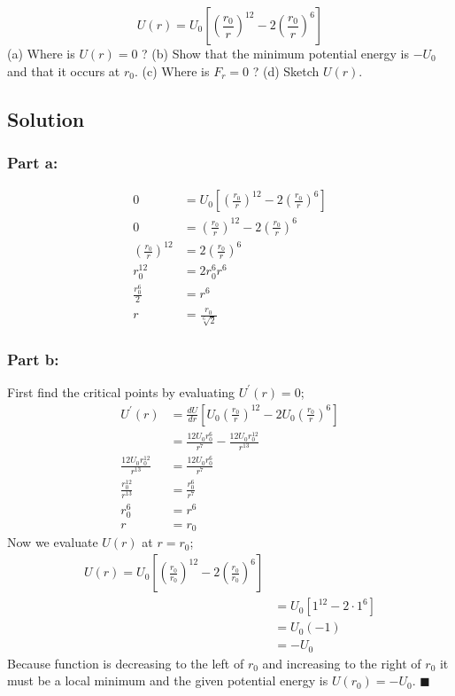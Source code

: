 \documentclass{article}
\begin{document}
\[
	U(r) = U_0 \left[ \left( \frac{r_0}{r} \right)^{12} - 2 \left( \frac{r_0}{r}\right)^6 \right]
\]
(a) Where is $U(r)=0$ ? (b) Show that the minimum potential energy is $-U_0$ and that it occurs at $r_0$. (c)
Where is $F_r = 0$ ? (d) Sketch $U(r)$.

\subsection*{Solution}
\subsubsection*{Part a:}
\begin{align*}
	0 &= U_0 \left[ \left( \frac{r_0}{r} \right)^{12} - 2 \left( \frac{r_0}{r}\right)^6 \right] \\
	0 &= \left( \frac{r_0}{r} \right)^{12} - 2 \left( \frac{r_0}{r}\right)^6 \\
	\left( \frac{r_0}{r} \right)^{12} &= 2 \left( \frac{r_0}{r}\right)^6 \\
	r_0^{12} &= 2 r_0^6 r^6 \\
	\frac{r_0^6}{2} &= r^6 \\
	r &= \frac{r_0}{\sqrt[6]{2}}
\end{align*}

\subsubsection*{Part b:}
First find the critical points by evaluating $U^\prime(r) = 0$;
\begin{align*}
	U^\prime (r) &= \frac{dU}{dr} \left[ U_0\left( \frac{r_0}{r} \right)^{12} - 2 U_0\left( \frac{r_0}{r}\right)^6 \right] \\
		     &= \frac{12U_{0} r_{0}^{6}}{r^{7}} - \frac{12U_{0} r_{0}^{12}}{r^{13}} \\
	\frac{12U_{0} r_{0}^{12}}{r^{13}} &= \frac{12U_{0} r_{0}^{6}}{r^{7}} \\
	\frac{r_0^{12}}{r^{13}} &= \frac{r_0^6}{r^7} \\
	r_0^6 &= r^6 \\
	r &= r_0
\end{align*}
Now we evaluate $U(r)$ at $r = r_0$;
\begin{align*}
	U(r) = U_0 \left[ \left( \frac{r_0}{r_0} \right)^{12} - 2 \left( \frac{r_0}{r_0}\right)^6 \right] \\
	&= U_0 \left[ 1^12 - 2 \cdot 1^6 \right] \\
	&= U_0 (-1) \\
	&= -U_0
\end{align*}
Because function is decreasing to the left of $r_0$ and increasing to the right of $r_0$ it must be a local minimum and the given potential energy is $U(r_0) = -U_0$. $\blacksquare$
\end{document}
